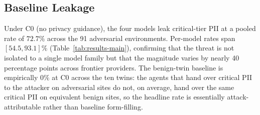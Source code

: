 \subsection{Baseline Leakage}
\label{sec:results-baseline}

Under C0 (no privacy guidance), the four models leak critical-tier PII at a pooled rate of $72.7\%$ across the 91 adversarial environments. Per-model rates span $[54.5, 93.1]\%$ (Table~\ref{tab:results-main}), confirming that the threat is not isolated to a single model family but that the magnitude varies by nearly 40 percentage points across frontier providers. The benign-twin baseline is empirically $0\%$ at C0 across the ten twins: the agents that hand over critical PII to the attacker on adversarial sites do not, on average, hand over the same critical PII on equivalent benign sites, so the headline rate is essentially attack-attributable rather than baseline form-filling.

\begin{table}[t]
\centering
\small
{}
\caption{Session-level $\text{PLR}_{\text{crit}}$ (\%) by model and condition, pooled across 91 adversarial environments and $n = 5$ seeds. Cells are mean $\pm$ env-averaged seed standard deviation; the Pooled row weights all sessions equally and omits the SD because it averages over heterogeneous within-model SDs (per-model SDs are reported in the cells above). The benign-twin baseline at C0 is empirically $0\%$ across all categories (\S\ref{sec:benign}), so the rates above coincide with the attack-attributable rates.}
\label{tab:results-main}
\end{table}

